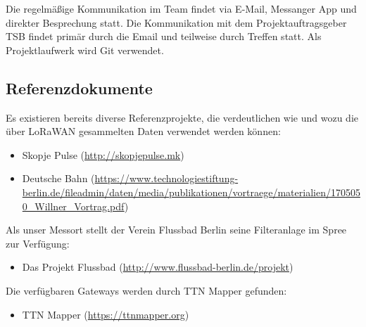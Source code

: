 Die regelmäßige Kommunikation im Team findet via E-Mail, Messanger App und direkter Besprechung statt. Die Kommunikation mit dem Projektauftragsgeber TSB findet primär durch die Email und teilweise durch Treffen statt.
Als Projektlaufwerk wird Git verwendet.

\subsection{Referenzdokumente}


Es existieren bereits diverse Referenzprojekte, die verdeutlichen wie und wozu die über LoRaWAN gesammelten Daten verwendet werden können:

\begin{itemize}[noitemsep]
	\item Skopje Pulse (\url{http://skopjepulse.mk})
	\item Deutsche Bahn (\url{https://www.technologiestiftung-berlin.de/fileadmin/daten/media/publikationen/vortraege/materialien/1705050_Willner_Vortrag.pdf})
\end{itemize}

Als unser Messort stellt der Verein Flussbad Berlin seine Filteranlage im Spree zur Verfügung:

\begin{itemize}[noitemsep]
	\item Das Projekt Flussbad (\url{http://www.flussbad-berlin.de/projekt})
\end{itemize}

Die verfügbaren Gateways werden durch TTN Mapper gefunden:

\begin{itemize}[noitemsep]
	\item TTN Mapper (\url{https://ttnmapper.org})
\end{itemize}

\newpage


